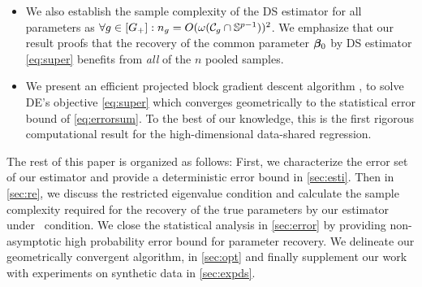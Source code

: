 \begin{itemize}[leftmargin = .4cm]
	\item We also establish the sample complexity of the DS estimator for all parameters as $\forall g \in [G_+]: n_g = O(\omega(\cC_g \cap \sphere))^2$. We emphasize that our result proofs that the recovery of the common parameter $\boldsymbol{\beta}_0$ by DS estimator \cref{eq:super} benefits from \emph{all} of the $n$ pooled samples.
	\item We present an efficient projected block gradient descent algorithm \emph{\dc}, to solve DE's objective \cref{eq:super} which converges geometrically to the statistical error bound of \cref{eq:errorsum}. To the best of our knowledge, this is the first rigorous computational result for the high-dimensional data-shared regression.
\end{itemize}

The rest of this paper is organized as follows:
First, we characterize the error set of our estimator and provide a deterministic error bound in \cref{sec:esti}.
Then in \cref{sec:re}, we discuss the restricted eigenvalue condition and calculate the sample complexity required for the recovery of the true parameters by our estimator under \ds\ condition.
We close the statistical analysis in \cref{sec:error} by providing non-asymptotic high probability error bound for parameter recovery.
We delineate our geometrically convergent algorithm, \dc{} in \cref{sec:opt} and finally supplement our work with experiments on synthetic data in \cref{sec:expds}.%

